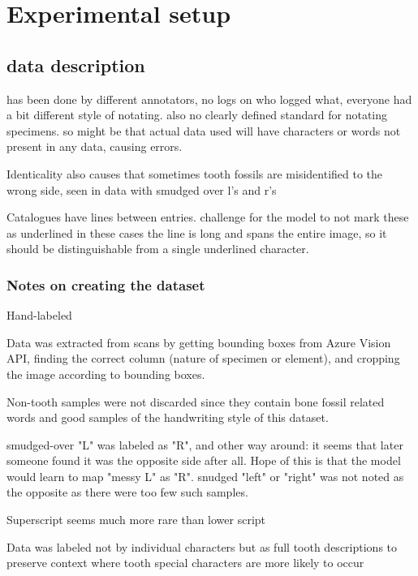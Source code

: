 \documentclass{article}
\begin{document}

\section{Experimental setup}


\subsection{data description}

has been done by different annotators, no logs on who logged what, everyone 
had a bit different style of notating. also no clearly defined standard 
for notating specimens. so might be that actual data used will have 
characters or words not present in any data, causing errors.


Identicality also causes that sometimes tooth fossils are misidentified to 
the wrong side, seen in data with smudged over l's and r's

Catalogues have lines between entries. challenge for the model to not mark these as underlined
in these cases the line is long and spans the entire image, so it should be distinguishable from 
a single underlined character.

\subsubsection{Notes on creating the dataset}

Hand-labeled

Data was extracted from scans by getting bounding boxes from Azure Vision API,
finding the correct column (nature of specimen or element), and cropping the image 
according to bounding boxes.

Non-tooth samples were not discarded since they contain 
bone fossil related words and good samples of the handwriting style of this dataset.

smudged-over "L" was labeled as "R", and other way around: it seems that later 
someone found it was the opposite side after all. Hope of this is that the model 
would learn to map "messy L" as "R". snudged "left" or "right" was not noted as the 
opposite as there were too few such samples.

Superscript seems much more rare than lower script

Data was labeled not by individual characters but as full tooth descriptions
to preserve context where tooth special characters are more likely to occur
\end{document}
